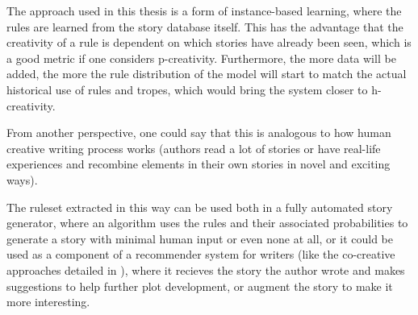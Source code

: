 The approach used in this thesis is a form of instance-based learning, where the
rules are learned from the story database itself. This has the advantage that
the creativity of a rule is dependent on which stories have already been seen,
which is a good metric if one considers p-creativity. Furthermore, the more data
will be added, the more the rule distribution of the model will start to match 
the actual historical use of rules and tropes, which would bring the system closer to
h-creativity.

From another perspective, one could say that this is analogous to how human
creative writing process works (authors read a lot of stories or have real-life
experiences and recombine elements in their own stories in novel and exciting ways).

The ruleset extracted in this way can be used both in a fully automated story
generator, where an algorithm uses the rules and their associated probabilities
to generate a story with minimal human input or even none at all, or it could be used as a component
of a recommender system for writers (like the co-creative approaches detailed in
\cite{kantosalo2014isolation}), where it recieves the story the author
wrote and makes suggestions to help further plot development, or augment the
story to make it more interesting.
